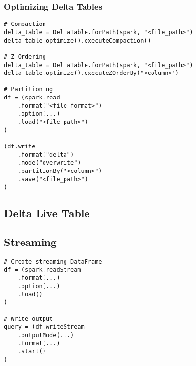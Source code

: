 \documentclass[11pt]{scrartcl}
\begin{document}
\newpage
\subsubsection{Optimizing Delta Tables} \label{optimize_python}
\begin{lstlisting}
# Compaction
delta_table = DeltaTable.forPath(spark, "<file_path>")
delta_table.optimize().executeCompaction()

# Z-Ordering
delta_table = DeltaTable.forPath(spark, "<file_path>")
delta_table.optimize().executeZOrderBy("<column>")

# Partitioning
df = (spark.read
	.format("<file_format>")
	.option(...)
	.load("<file_path>")
)

(df.write
	.format("delta")
	.mode("overwrite")
	.partitionBy("<column>")
	.save("<file_path>")
)
\end{lstlisting}

\subsection{Delta Live Table} \label{delta_live_python}

\subsection{Streaming} \label{streaming_python}
\begin{lstlisting}
# Create streaming DataFrame
df = (spark.readStream
	.format(...)
	.option(...)
	.load()
)

# Write output
query = (df.writeStream
	.outputMode(...)
	.format(...)
	.start()
)
\end{lstlisting}
\end{document}
